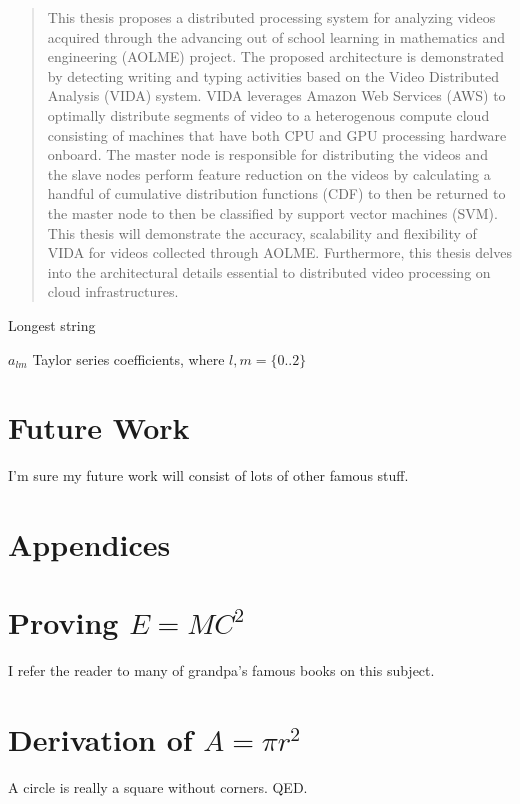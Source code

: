 \documentclass[botnum, fleqn]{unmeethesis}
\begin{document}
  \begin{abstract}
    This thesis proposes a distributed processing system for analyzing
    videos acquired through the advancing out of school learning in
    mathematics and engineering (AOLME) project. The
    proposed architecture is demonstrated by detecting writing and typing
    activities based on the Video Distributed Analysis (VIDA) system. VIDA
    leverages Amazon Web Services (AWS) to optimally distribute segments of
    video to a heterogenous compute cloud consisting of machines that have both
    CPU and GPU processing hardware onboard. The master node is responsible for
    distributing the videos and the slave nodes perform feature reduction on the
    videos by calculating a handful of cumulative distribution functions (CDF)
    to then be returned to the master node to then be classified by support vector
    machines (SVM). This thesis will demonstrate the accuracy,
    scalability and flexibility of VIDA for videos collected through AOLME. Furthermore,
    this thesis delves into the architectural details essential to distributed
    video processing on cloud infrastructures.

    \clearpage %
  \end{abstract}

  \tableofcontents
  \listoffigures
  \listoftables

  \begin{glossary}{Longest  string}
    \item[$a_{lm}$]
    Taylor series coefficients, where $l,m = \{0..2\}$
  \end{glossary}

  \mainmatter

  


  \chapter{Future Work}
  I'm sure my future work will consist of lots of other famous stuff.

  \chapter*{Appendices}


  \appendix
  \chapter{Proving $E=MC^2$}
  I refer the reader to many of grandpa's famous books on this subject.
  \chapter{Derivation of $A = \pi r^2$}
  A circle is really a square without corners.  QED.

\end{document}
